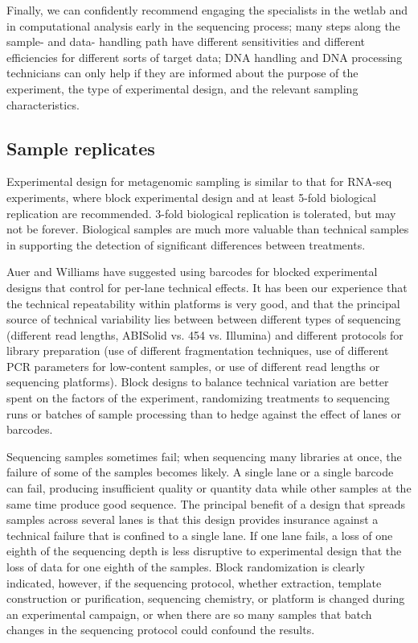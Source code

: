 \documentclass[graybox]{svmult}
\begin{document}
Finally, we can confidently recommend engaging the specialists in the wetlab and in computational analysis early in the sequencing process; many steps along the sample- and data- handling path have different sensitivities and different efficiencies for different sorts of target data; DNA handling and DNA processing technicians can only help if they are informed about the purpose of the experiment, the type of experimental design, and the relevant sampling characteristics.  

\subsection{Sample replicates} 
\label{subsec:2}
%
Experimental design for metagenomic sampling is similar to that for RNA-seq experiments, where block experimental design and at least 5-fold biological replication are recommended.  3-fold biological replication is tolerated, but may not be forever.   Biological samples are much more valuable than technical samples in supporting the detection of significant differences between treatments. 

Auer\cite{Auer2010Statistical} and Williams\cite{Williams2001RNAseq} have suggested using barcodes for blocked experimental designs that control for per-lane technical effects.   It has been our experience that the technical repeatability within platforms is very good, and that the principal source of technical variability lies between between different types of sequencing (different read lengths, ABISolid vs. 454 vs. Illumina) and different protocols for library preparation (use of different fragmentation techniques, use of different PCR parameters for low-content samples, or use of different read lengths or sequencing platforms).  Block designs to balance technical variation are better spent on the factors of the experiment, randomizing treatments to sequencing runs or batches of sample processing than to hedge against the effect of lanes or barcodes.  

Sequencing samples sometimes fail; when sequencing many libraries at once, the failure of some of the samples becomes likely.    
A single lane or a single barcode can fail, producing insufficient quality or quantity data while other samples at the same time produce good sequence.
The principal benefit of a design that spreads samples across several lanes is that this design provides insurance against a technical failure that is confined to a single lane.  If one lane fails, a loss of one eighth of the sequencing depth is less disruptive to experimental design that the loss of data for one eighth of the samples.   Block randomization is clearly indicated, however, if the sequencing protocol, whether extraction, template construction or purification, sequencing chemistry, or platform is changed during an experimental campaign, or when there are so many samples that batch changes in the sequencing protocol could confound the results.
\end{document}
